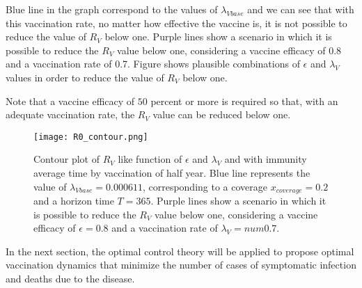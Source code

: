 Blue line in the graph correspond to the values of $\lambda_{Vbase}$
and we can see that with this vaccination rate, no matter how
effective the vaccine is, it is not possible to reduce the value of
$R_V$ below one. Purple lines show a scenario in which it is
possible to reduce the $R_V$ value below one, considering a vaccine
efficacy of 0.8 and a vaccination rate of 0.7. Figure shows
plausible combinations of $\epsilon$ and $\lambda_V$ values in order
to reduce the value of $R_V$ below one.

Note that a vaccine efficacy of $50$ percent or more is required so that,
with an adequate vaccination rate, the $R_V$ value can be reduced below one.

\begin{figure}[!h]
    \centering
    \texttt{[image: R0\_contour.png]}
    \caption{
        Contour plot  of $R_V$ like function of $\epsilon$ and
        $\lambda_V $ and with immunity average time by vaccination of half year.
        Blue line represents the value of $\lambda_{Vbase} = \num{0.000611}$,
        corresponding to a coverage $x_{coverage}=\num{0.2}$
        and a horizon time $T=\num{365}$. Purple lines show a scenario
        in which it is possible to reduce the $R_V$ value below one,
        considering a vaccine efficacy of $\epsilon =\num{0.8}$
        and a vaccination rate of $\lambda_V = num{0.7}$.
    }
    \label{R0_contour}
\end{figure}


    In the next section, the optimal control theory will be applied to propose
optimal vaccination dynamics that minimize the number of cases of symptomatic
infection and deaths due to the disease.